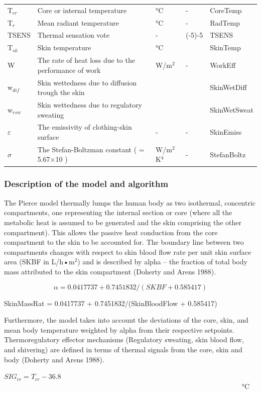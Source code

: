 \begin{longtable}[c]{p{1.2in}p{2.0in}p{0.8in}p{0.8in}p{1.2in}}
T\(_{cr}\) & Core or internal temperature & °C & - & CoreTemp \tabularnewline
T\(_{r}\) & Mean radiant temperature & °C & - & RadTemp \tabularnewline
TSENS & Thermal sensation vote & - & (-5)-5 & TSENS \tabularnewline
T\(_{sk}\) & Skin temperature & °C & ~ & SkinTemp \tabularnewline
W & The rate of heat loss due to the performance of work & W/m\(^{2}\) & - & WorkEff \tabularnewline
w\(_{dif}\) & Skin wettedness due to diffusion trough the skin & ~ & ~ & SkinWetDiff \tabularnewline
w\(_{rsw}\) & Skin wettedness due to regulatory sweating & ~ & ~ & SkinWetSweat \tabularnewline
$\varepsilon$ & The emissivity of clothing-skin surface & - & - & SkinEmiss \tabularnewline
$\sigma$ & The Stefan-Boltzman constant ( = 5.67×10  ) & W/m\(^{2}\)K\(^{4}\) & - & StefanBoltz \tabularnewline
\bottomrule
\end{longtable}

\subsubsection{Description of the model and algorithm}\label{description-of-the-model-and-algorithm-1}

The Pierce model thermally lumps the human body as two isothermal, concentric compartments, one representing the internal section or core (where all the metabolic heat is assumed to be generated and the skin comprising the other compartment). This allows the passive heat conduction from the core compartment to the skin to be accounted for. The boundary line between two compartments changes with respect to skin blood flow rate per unit skin surface area (SKBF in L/h•m\(^{2}\)) and is described by alpha -- the fraction of total body mass attributed to the skin compartment (Doherty and Arens 1988).

\begin{equation}
\alpha  = 0.0417737 + 0.7451832/(SKBF + 0.585417)
\end{equation}

SkinMassRat = 0.0417737 + 0.7451832/(SkinBloodFlow + 0.585417)

Furthermore, the model takes into account the deviations of the core, skin, and mean body temperature weighted by alpha from their respective setpoints. Thermoregulatory effector mechanisms (Regulatory sweating, skin blood flow, and shivering) are defined in terms of thermal signals from the core, skin and body (Doherty and Arens 1988).

\(SI{G_{cr}} = {T_{cr}} - 36.8\) ~~~~~~~~~~~~~~~~~~~~~~~~~~~~~~~~~~~~~~~~~~~~~~~~~~~~~~~~~~~~~~~~~~~ °C

